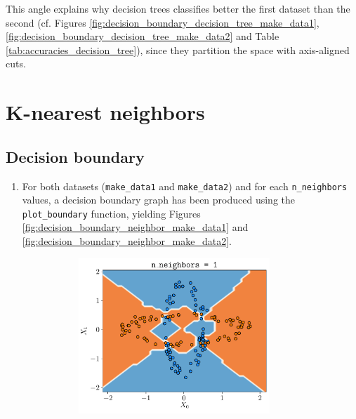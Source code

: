 \documentclass[a4paper, 12pt]{article}
\begin{document}
    This angle explains why decision trees classifies better the first dataset than the second (cf. Figures \ref{fig:decision_boundary_decision_tree_make_data1}, \ref{fig:decision_boundary_decision_tree_make_data2} and Table \ref{tab:accuracies_decision_tree}), since they partition the space with axis-aligned cuts.
    
	\section{K-nearest neighbors}
	\subsection{Decision boundary}
    \begin{enumerate}[label = (\alph*)]    
        \item For both datasets (\texttt{make\_data1} and \texttt{make\_data2}) and for each \texttt{n\_neighbors} values, a decision boundary graph has been produced using the \texttt{plot\_boundary} function, yielding Figures \ref{fig:decision_boundary_neighbor_make_data1} and \ref{fig:decision_boundary_neighbor_make_data2}.
        \begin{figure}[h]
            \centering
            \begin{subfigure}{0.49\textwidth}
                \centering
        	    \includegraphics[width=0.85\textwidth]{resources/pdf/make_data1_neighbors1.pdf}
            \end{subfigure}
            \begin{subfigure}{0.49\textwidth}
                \centering

\end{subfigure}
\end{figure}
\end{enumerate}
\end{document}
